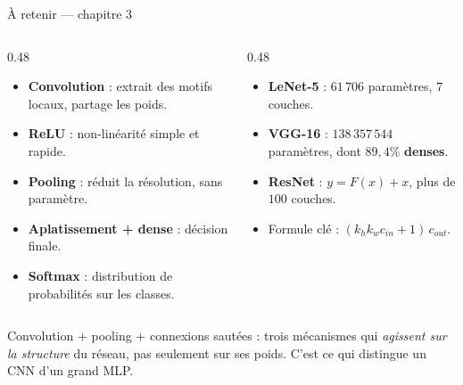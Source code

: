 \begin{frame}{À retenir --- chapitre 3}
\begin{columns}[t]
\begin{column}{0.48\textwidth}
\begin{kbox}
\begin{itemize}
  \item \textbf{Convolution} : extrait des motifs locaux, partage les poids.
  \item \textbf{ReLU} : non-linéarité simple et rapide.
  \item \textbf{Pooling} : réduit la résolution, sans paramètre.
  \item \textbf{Aplatissement + dense} : décision finale.
  \item \textbf{Softmax} : distribution de probabilités sur les classes.
\end{itemize}
\end{kbox}
\end{column}
\begin{column}{0.48\textwidth}
\begin{kbox}
\begin{itemize}
  \item \textbf{LeNet-5} : $61\,706$ paramètres, $7$ couches.
  \item \textbf{VGG-16} : $138\,357\,544$ paramètres, dont
  $89{,}4 \%$ \textbf{denses}.
  \item \textbf{ResNet} : $y = F(x) + x$, plus de $100$ couches.
  \item Formule clé : $(k_h k_w c_{in} + 1)\,c_{out}$.
\end{itemize}
\end{kbox}
\end{column}
\end{columns}
\vspace{1mm}
\begin{wbox}
Convolution $+$ pooling $+$ connexions sautées : trois mécanismes qui
\emph{agissent sur la structure} du réseau, pas seulement sur ses poids.
C'est ce qui distingue un CNN d'un grand MLP.
\end{wbox}
\end{frame}

